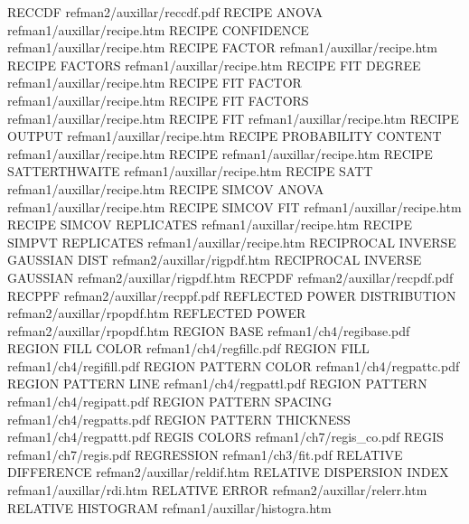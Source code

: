 RECCDF                                  refman2/auxillar/reccdf.pdf
RECIPE ANOVA                            refman1/auxillar/recipe.htm
RECIPE CONFIDENCE                       refman1/auxillar/recipe.htm
RECIPE FACTOR                           refman1/auxillar/recipe.htm
RECIPE FACTORS                          refman1/auxillar/recipe.htm
RECIPE FIT DEGREE                       refman1/auxillar/recipe.htm
RECIPE FIT FACTOR                       refman1/auxillar/recipe.htm
RECIPE FIT FACTORS                      refman1/auxillar/recipe.htm
RECIPE FIT                              refman1/auxillar/recipe.htm
RECIPE OUTPUT                           refman1/auxillar/recipe.htm
RECIPE PROBABILITY CONTENT              refman1/auxillar/recipe.htm
RECIPE                                  refman1/auxillar/recipe.htm
RECIPE SATTERTHWAITE                    refman1/auxillar/recipe.htm
RECIPE SATT                             refman1/auxillar/recipe.htm
RECIPE SIMCOV ANOVA                     refman1/auxillar/recipe.htm
RECIPE SIMCOV FIT                       refman1/auxillar/recipe.htm
RECIPE SIMCOV REPLICATES                refman1/auxillar/recipe.htm
RECIPE SIMPVT REPLICATES                refman1/auxillar/recipe.htm
RECIPROCAL INVERSE GAUSSIAN DIST        refman2/auxillar/rigpdf.htm
RECIPROCAL INVERSE GAUSSIAN             refman2/auxillar/rigpdf.htm
RECPDF                                  refman2/auxillar/recpdf.pdf
RECPPF                                  refman2/auxillar/recppf.pdf
REFLECTED POWER DISTRIBUTION            refman2/auxillar/rpopdf.htm
REFLECTED POWER                         refman2/auxillar/rpopdf.htm
REGION BASE                             refman1/ch4/regibase.pdf
REGION FILL COLOR                       refman1/ch4/regfillc.pdf
REGION FILL                             refman1/ch4/regifill.pdf
REGION PATTERN COLOR                    refman1/ch4/regpattc.pdf
REGION PATTERN LINE                     refman1/ch4/regpattl.pdf
REGION PATTERN                          refman1/ch4/regipatt.pdf
REGION PATTERN SPACING                  refman1/ch4/regpatts.pdf
REGION PATTERN THICKNESS                refman1/ch4/regpattt.pdf
REGIS COLORS                            refman1/ch7/regis_co.pdf
REGIS                                   refman1/ch7/regis.pdf
REGRESSION                              refman1/ch3/fit.pdf
RELATIVE DIFFERENCE                     refman2/auxillar/reldif.htm
RELATIVE DISPERSION INDEX               refman1/auxillar/rdi.htm
RELATIVE ERROR                          refman2/auxillar/relerr.htm
RELATIVE HISTOGRAM                      refman1/auxillar/histogra.htm
